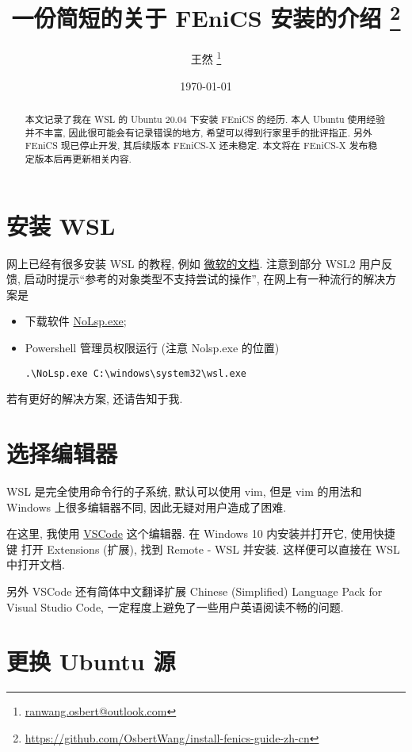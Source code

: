 \documentclass[fontset=founder]{ctexart}
\title{\bfseries 一份简短的关于 FEniCS 安装的介绍%
  \thanks{\url{https://github.com/OsbertWang/install-fenics-guide-zh-cn}}%
}
\author{王然%
  \thanks{\href{mailto:ranwang.osbert@outlook.com}%
    {\ttfamily ranwang.osbert@outlook.com}}%
}
\date{\today}
\begin{document}
  
\maketitle

\begin{abstract}
  本文记录了我在 WSL 的 Ubuntu 20.04 下安装 FEniCS 的经历.
  本人 Ubuntu 使用经验并不丰富,
  因此很可能会有记录错误的地方,
  希望可以得到行家里手的批评指正.
  另外 FEniCS 现已停止开发,
  其后续版本 FEniCS-X 还未稳定.
  本文将在 FEniCS-X 发布稳定版本后再更新相关内容.
\end{abstract}

\section{安装 WSL}

网上已经有很多安装 WSL 的教程,
例如%
\href{https://docs.microsoft.com/zh-cn/windows/wsl/install-win10}{微软的文档}.
注意到部分 WSL2 用户反馈,
启动时提示``参考的对象类型不支持尝试的操作'',
在网上有一种流行的解决方案是
\begin{itemize}
  \item 下载软件 \href{https://www.proxifier.com/tmp/Test20200228/NoLsp.exe}{NoLsp.exe};
  \item Powershell 管理员权限运行 (注意 Nolsp.exe 的位置)
  \begin{lstlisting}[gobble=4]
    .\NoLsp.exe C:\windows\system32\wsl.exe  
  \end{lstlisting}
\end{itemize}
若有更好的解决方案,
还请告知于我.

\section{选择编辑器}

WSL 是完全使用命令行的子系统,
默认可以使用 vim,
但是 vim 的用法和 Windows 上很多编辑器不同,
因此无疑对用户造成了困难.

在这里,
我使用
\href{https://code.visualstudio.com/}{VSCode}
这个编辑器.
在 Windows 10 内安装并打开它,
使用快捷键  打开 \textsf{Extensions (扩展)},
找到 \textsf{Remote - WSL} 并安装.
这样便可以直接在 WSL 中打开文档.

另外 VSCode 还有简体中文翻译扩展 \textsf{Chinese (Simplified) Language Pack for Visual Studio Code},
一定程度上避免了一些用户英语阅读不畅的问题.

\section{更换 Ubuntu 源}
\end{document}

